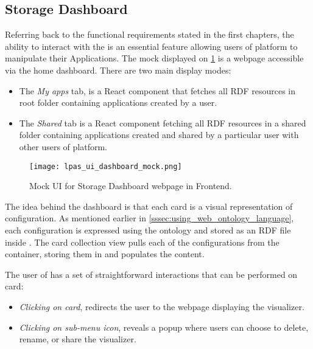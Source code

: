 \subsection{Storage Dashboard}
\label{sssec:architecture_storage_dashboard}

Referring back to the functional requirements stated in the first chapters, the ability to interact with the \lpas{} is an essential feature allowing users of \lpa{} platform to manipulate their Applications. The mock displayed on \ref{fig:lpas_ui_dashboard_mock} is a webpage accessible via the home dashboard. There are two main display modes:

\begin{itemize}
    \item The \textit{My apps} tab, is a React component that fetches all RDF resources in root \lpas{} folder containing applications created by a user. 
    \item The \textit{Shared} tab is a React component fetching all RDF resources in a shared \lpas{} folder containing applications created and shared by a particular user with other users of \lpas{} platform.
\end{itemize}


\begin{figure}[h]
\centering
\texttt{[image: lpas\_ui\_dashboard\_mock.png]}
\caption{Mock UI for Storage Dashboard webpage in \lpa{} Frontend.}
\label{fig:lpas_ui_dashboard_mock}
\end{figure}



The idea behind the dashboard is that each card is a visual representation of \lpa{} configuration. As mentioned earlier in \autoref{sssec:using_web_ontology_language}, each configuration is expressed using the \lpas{} ontology and stored as an RDF file inside \solid{}. The card collection view pulls each of the configurations from the container, storing them in \solid{} and populates the content. 

The user of \lpa{} has a set of straightforward interactions that can be performed on card:
\begin{itemize}
    \item \textit{Clicking on card}, redirects the user to the webpage displaying the visualizer.
    \item \textit{Clicking on sub-menu icon}, reveals a popup where users can choose to delete, rename, or share the visualizer.
\end{itemize}


